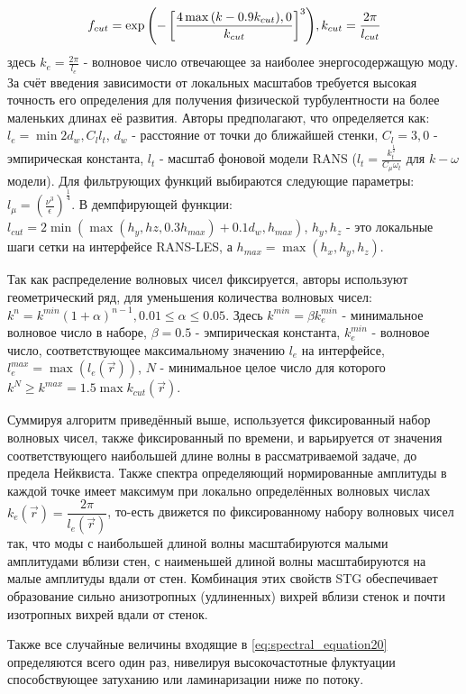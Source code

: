 \begin{equation}
    \label{eq:spectral_equation23_1}
    f_{cut} = \exp{\left(-\left[ \frac{4 \max{(k - 0.9 k_{cut}), 0}}{k_{cut}} \right]^3\right)},\\
    k_{cut} = \dfrac{2 \pi}{l_{cut}} 
\end{equation}
\noindent
здесь $k_e = \frac{2 \pi}{l_e}$ - волновое число отвечающее за наиболее энергосодержащую моду. За счёт введения зависимости от локальных масштабов требуется высокая точность его определения для получения физической турбулентности на более маленьких длинах её развития. Авторы предполагают, что определяется как: $l_e = \min{2 d_w, C_l l_t}$, $d_w$ - расстояние от точки до ближайшей стенки, $C_l = 3,0$ - эмпирическая константа, $l_t$ - масштаб фоновой модели RANS ($l_t = \frac{k_t^\frac{1}{2}}{C_\mu \omega_t}$ для  $k-\omega$ модели). Для фильтрующих функций выбираются следующие параметры: $l_\mu = (\frac{\nu^3}{\epsilon})^\frac{1}{4}$. В демпфирующей функции: $l_{cut} = 2 \min{(\max{(h_y, hz, 0.3 h_{max})} + 0.1 d_w, h_{max})}$, $h_y,h_z$ - это локальные шаги сетки на интерфейсе RANS-LES, а $h_{max}=\max{(h_x,h_y,h_z)}$.

Так как распределение волновых чисел фиксируется, авторы используют геометрический ряд, для уменьшения количества волновых чисел: $k^n = k^{min}(1 + \alpha)^{n -1}, 0.01 \leq \alpha \leq 0.05$. Здесь $k^{min} = \beta k^{min}_e$ - минимальное волновое число в наборе, $\beta = 0.5$ - эмпирическая константа, $k^{min}_e$ - волновое число, соответствующее максимальному значению $l_e$ на интерфейсе, $l_e^{max} = \max{(l_e(\vec r))}$, $N$ - минимальное целое число для которого $k^N \geq k^{max} = 1.5 \max{k_{cut}(\vec r)}$. 

Суммируя алгоритм приведённый выше, используется фиксированный набор волновых чисел, также фиксированный по времени, и варьируется от значения соответствующего наибольшей длине волны в рассматриваемой задаче, до предела Нейквиста. Также спектра определяющий нормированные амплитуды в каждой точке имеет максимум при локально определённых волновых числах $k_e(\vec r) =\dfrac{2 \pi}{l_e(\vec r)}$, то-есть движется по фиксированному набору волновых чисел так, что моды с наибольшей длиной волны масштабируются малыми амплитудами вблизи стен, с наименьшей длиной волны масштабируются на малые амплитуды вдали от стен. Комбинация этих свойств STG обеспечивает образование сильно анизотропных (удлиненных) вихрей вблизи стенок и почти изотропных вихрей вдали от стенок.

Также все случайные величины входящие в \eqref{eq:spectral_equation20} определяются всего один раз, нивелируя высокочастотные флуктуации способствующее затуханию или ламинаризации ниже по потоку.
